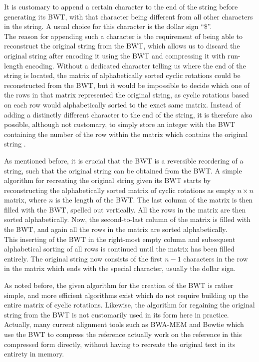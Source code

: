 \documentclass[a4paper,12pt,twoside,BCOR=10mm]{scrbook}
\begin{document}
It is customary to append a certain character to the end of the string before generating its BWT,
with that character being different from all other characters in the string.
A usual choice for this character is the dollar sign “\$”. \\
The reason for appending such a character is the requirement of being able to reconstruct the original string
from the BWT, which allows us to discard the original string after encoding it using the BWT
and compressing it with run-length encoding.
Without a dedicated character telling us where the end of the string is located,
the matrix of alphabetically sorted cyclic rotations could be reconstructed from the BWT,
but it would be impossible to decide which one of the rows in that matrix represented the original
string, as cyclic rotations based on each row would alphabetically sorted to the exact same matrix.
Instead of adding a distinctly different character to the end of the string,
it is therefore also possible, although not customary, to simply store an integer with the BWT containing
the number of the row within the matrix which contains the original string \citep{Nelson1996}.

As mentioned before, it is crucial that the BWT is a reversible reordering of a string,
such that the original string can be obtained from the BWT.
A simple algorithm for recreating the original string given its BWT starts by reconstructing the alphabetically sorted
matrix of cyclic rotations as empty $ n {\times} n $ matrix, where $ n $ is the length of the BWT.
The last column of the matrix is then filled with the BWT, spelled out vertically.
All the rows in the matrix are then sorted alphabetically.
Now, the second-to-last column of the matrix is filled with the BWT,
and again all the rows in the matrix are sorted alphabetically. \\
This inserting of the BWT in the right-most empty column and subsequent alphabetical sorting of all rows
is continued until the matrix has been filled entirely.
The original string now consists of the first $ n - 1 $ characters in the row in the matrix which
ends with the special character,
usually the dollar sign.


As noted before, the given algorithm for the creation of the BWT is rather simple,
and more efficient algorithms exist which do not require building up the entire matrix of cyclic rotations.
Likewise, the algorithm for regaining the original string from the BWT is not customarily
used in its form here in practice. \\
Actually, many current alignment tools such as BWA-MEM \citep{Li2013} and Bowtie \citep{Langmead2009} which use
the BWT to compress the reference actually
work on the reference in this compressed form directly, without having
to recreate the original text in its entirety in memory.
\end{document}
